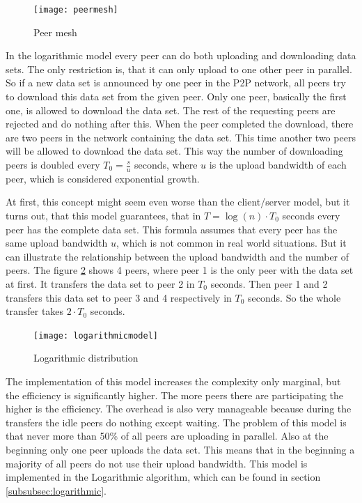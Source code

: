 \begin{figure}[H]
\centering
\texttt{[image: peermesh]}
\caption{Peer mesh}
\label{fig:peermesh}
\end{figure}

In the logarithmic model every peer can do both uploading and downloading data sets. The only restriction is, that it can only upload to one other peer in parallel. So if a new data set is announced by one peer in the P2P network, all peers try to download this data set from the given peer. Only one peer, basically the first one, is allowed to download the data set. The rest of the requesting peers are rejected and do nothing after this. When the peer completed the download, there are two peers in the network containing the data set. This time another two peers will be allowed to download the data set. This way the number of downloading peers is doubled every $T_0 = \frac{s}{u}$ seconds, where $u$ is the upload bandwidth of each peer, which is considered exponential growth. 

At first, this concept might seem even worse than the client/server model, but it turns out, that this model guarantees, that in $T=\log{(n)} \cdot T_0$  seconds every peer has the complete data set. This formula assumes that every peer has the same upload bandwidth $u$, which is not common in real world situations. But it can illustrate the relationship between the upload bandwidth and the number of peers. The figure \ref{fig:logarithmicmodel} shows 4 peers, where peer 1 is the only peer with the data set at first. It transfers the data set to peer 2 in $T_0$ seconds. Then peer 1 and 2 transfers this data set to peer 3 and 4 respectively in $T_0$ seconds. So the whole transfer takes $2 \cdot T_0$ seconds.

\begin{figure}[H]
\centering
\texttt{[image: logarithmicmodel]}
\caption{Logarithmic distribution}
\label{fig:logarithmicmodel}
\end{figure}

The implementation of this model increases the complexity only marginal, but the efficiency is significantly higher. The more peers there are participating the higher is the efficiency. The overhead is also very manageable because during the transfers the idle peers do nothing except waiting. The problem of this model is that never more than 50\% of all peers are uploading in parallel. Also at the beginning only one peer uploads the data set. This means that in the beginning a majority of all peers do not use their upload bandwidth. This model is implemented in the Logarithmic algorithm, which can be found in section \ref{subsubsec:logarithmic}.

